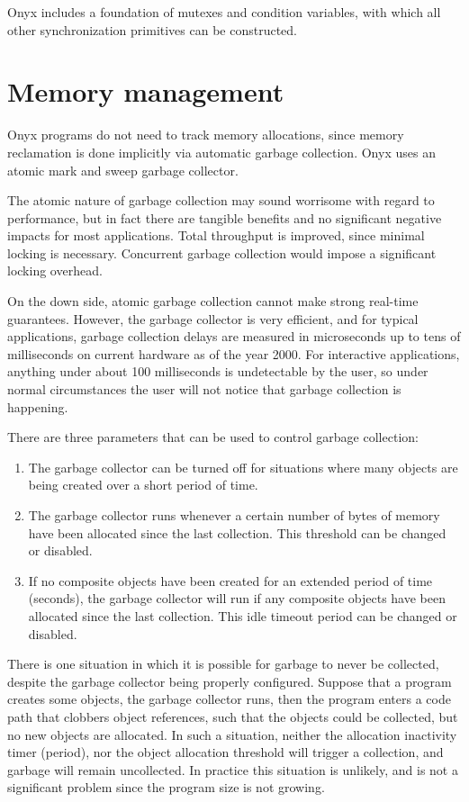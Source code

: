 Onyx includes a foundation of mutexes and condition variables, with which all
other synchronization primitives can be constructed.

\section{Memory management}
Onyx programs do not need to track memory allocations, since memory reclamation
is done implicitly via automatic garbage collection.  Onyx uses an atomic mark
and sweep garbage collector.

The atomic nature of garbage collection may sound worrisome with regard to
performance, but in fact there are tangible benefits and no significant negative
impacts for most applications.  Total throughput is improved, since minimal
locking is necessary.  Concurrent garbage collection would impose a significant
locking overhead.

On the down side, atomic garbage collection cannot make strong real-time
guarantees.  However, the garbage collector is very efficient, and for typical
applications, garbage collection delays are measured in microseconds up to tens
of milliseconds on current hardware as of the year 2000.  For interactive
applications, anything under about 100 milliseconds is undetectable by the user,
so under normal circumstances the user will not notice that garbage collection
is happening.

There are three parameters that can be used to control garbage collection:
\begin{enumerate}
\item{The garbage collector can be turned off for situations where many objects
are being created over a short period of time.}
\item{The garbage collector runs whenever a certain number of bytes of memory
have been allocated since the last collection.  This threshold can be changed or
disabled.}
\item{If no composite objects have been created for an extended period of time
(seconds), the garbage collector will run if any composite objects have been
allocated since the last collection.  This idle timeout period can be changed or
disabled.}
\end{enumerate}

There is one situation in which it is possible for garbage to never be
collected, despite the garbage collector being properly configured.  Suppose
that a program creates some objects, the garbage collector runs, then the
program enters a code path that clobbers object references, such that the
objects could be collected, but no new objects are allocated.  In such a
situation, neither the allocation inactivity timer (period), nor the object
allocation threshold will trigger a collection, and garbage will remain
uncollected.  In practice this situation is unlikely, and is not a significant
problem since the program size is not growing.

